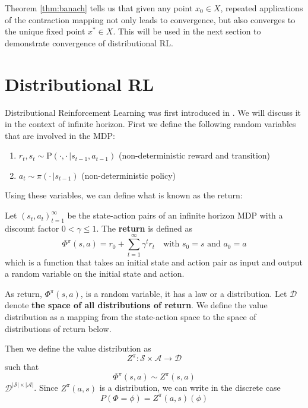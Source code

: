 \documentclass{article}
\begin{document}
Theorem \ref{thm:banach} tells us that given any point $x_0 \in X$, repeated applications of the contraction mapping not only leads to convergence, but also converges to the unique fixed point $x^* \in X$. This will be used in the next section to demonstrate convergence of distributional RL.

\section{Distributional RL}
Distributional Reinforcement Learning was first introduced in \citet{distributional}. We will discuss it in the context of infinite horizon.
First we define the following random variables that are involved in the MDP:
\begin{enumerate}
    \item $r_t, s_t \sim \text{P}(\cdot,\cdot \,|s_{t-1}, a_{t-1})$ (non-deterministic reward and transition)
    \item $a_t \sim \pi(\cdot \,|s_{t-1})$ (non-deterministic policy)
\end{enumerate}
Using these variables, we can define what is known as the return:
\begin{defn}[Return]
\label{def:Return}
Let $(s_t,a_t)_{t=1}^\infty$ be the state-action pairs of an infinite horizon MDP with a discount factor $0<\gamma\leq1$.
The \textbf{return} is defined as
\begin{equation}
    \Phi^\pi(s, a)=r_0+\sum_{t=1}^{\infty} \gamma^t r_t \,\,\, \, \, \, \text{with } s_0=s \text{ and } a_0 = a 
\end{equation}
which is a function that takes an initial state and action pair as input and output a random variable on the initial state and action. 
\end{defn}

As return, $\Phi^\pi(s,a)$, is a random variable, it has a law or a distribution.  
Let $\mathcal{D}$ denote \textbf{the space of all distributions of return}.
We define the value distribution as a mapping from the state-action space to the space of distributions of return below.

\begin{defn} \label{def:valueDistribution}
Then we define the value distribution as
$$Z^\pi:\mathcal{S}\times \mathcal{A} \rightarrow \mathcal{D}$$
such that
\begin{equation*}
 \Phi^\pi(s, a) \sim Z^\pi(s, a)
\end{equation*}
 $\mathcal{D}^{|\mathcal{S}|\times|\mathcal{A}|}$. Since $Z^\pi(a, s)$ is a distribution, we can write in the discrete case
$$P(\Phi=\phi)=Z^\pi(a, s)(\phi)$$
\end{defn}
\end{document}
